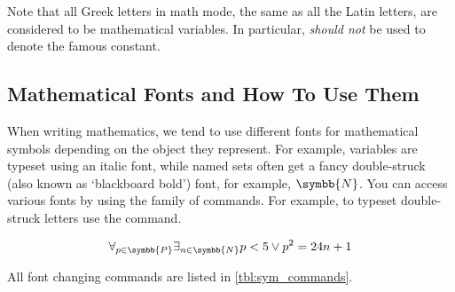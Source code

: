 Note that all Greek letters in math mode, the same as all the Latin letters,
are considered to be mathematical variables. In particular, 
\emph{should not} be used to denote the famous constant.

\subsection{Mathematical Fonts and How To Use Them}

When writing mathematics, we tend to use different fonts for
mathematical symbols depending on the object they represent. For example,
variables are typeset using an italic font, while named sets often get a fancy
double-struck (also known as \enquote*{blackboard bold}) font, for example,
\(\symbb{N}\). You can access various fonts by using the family of 
commands. For example, to typeset double-struck letters use the 
command.
\begin{example}
\[
  \forall_{p \in \symbb{P}}
  \exists_{n \in \symbb{N}}
  p < 5 \lor p^2 = 24n + 1
\]
\end{example}
All font changing commands are listed in \autoref{tbl:sym_commands}.
